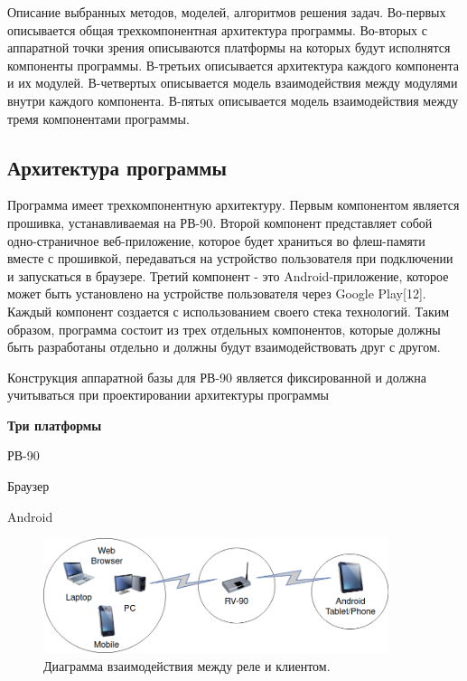 Описание выбранных методов, моделей, алгоритмов решения задач.
Во-первых описывается общая трехкомпонентная архитектура программы.
Во-вторых с аппаратной точки зрения описываются платформы на которых будут исполнятся компоненты программы.
В-третьих описывается архитектура каждого компонента и их модулей.
В-четвертых описывается модель взаимодействия между модулями внутри каждого компонента.
В-пятых описывается модель взаимодействия между тремя компонентами программы.

\subsection{ Архитектура программы }
Программа имеет трехкомпонентную архитектуру. Первым компонентом является прошивка, устанавливаемая на РВ-90. Второй компонент представляет собой одно-страничное веб-приложение, которое будет храниться во флеш-памяти вместе с прошивкой, передаваться на устройство пользователя при подключении и запускаться в браузере. Третий компонент - это Android-приложение, которое может быть установлено на устройстве пользователя через Google Play[12]. Каждый компонент создается с использованием своего стека технологий. Таким образом, программа состоит из трех отдельных компонентов, которые должны быть разработаны отдельно и должны будут взаимодействовать друг с другом. 
 
Конструкция аппаратной базы для РВ-90 является фиксированной и должна учитываться при проектировании архитектуры программы

\textbf{Три платформы}
\begin{my_itemize}
\item РВ-90
\item Браузер
\item Android
\end{my_itemize}


\begin{figure}[h!]
    \centering
    \includegraphics[width=0.9\textwidth]{three_platforms.png}
    \caption{Диаграмма взаимодействия между реле и клиентом.}
\end{figure}



